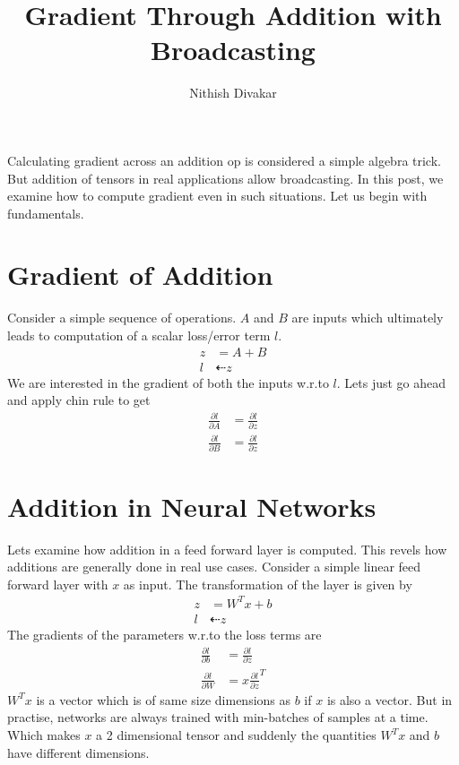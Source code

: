 \documentclass[12pt,crop=false,class=article,convert={density=300,outext=.compiled.png}]{standalone}
\title{\Huge Gradient Through Addition with Broadcasting}
\date{}
\author{Nithish Divakar}
\begin{document}
\maketitle


Calculating gradient across an addition op is considered a simple algebra trick. But addition of tensors in real applications allow broadcasting. In this post, we examine how to compute gradient even in such situations.  Let us begin with fundamentals.

\section*{Gradient of Addition}

Consider a simple sequence of operations. $A$ and $B$ are inputs which ultimately leads to computation of a scalar loss/error term $l$. 
 \begin{align*}
  z &= A+B
  \\
  l &\dashleftarrow z
 \end{align*}
We are interested in the gradient of both the inputs w.r.to $l$. Lets just go ahead and apply chin rule to get
\begin{align*}
  \frac{\partial l}{\partial A} &= \frac{\partial l}{\partial z}
  \\ 
  \frac{\partial l}{\partial B} &= \frac{\partial l}{\partial z}
\end{align*}

\section*{Addition in Neural Networks}

Lets examine how addition in a feed forward layer is computed. This revels how additions are generally done in real use cases. Consider a simple linear feed forward layer with $x$ as input. The transformation of the layer is given by
\begin{align*}
  z &= W^Tx+b
  \\
  l &\dashleftarrow z
\end{align*}
The gradients of the parameters w.r.to the loss terms are 
\begin{align*}
  \frac{\partial l}{\partial b} &=\frac{\partial l}{\partial z}
  \\
  \frac{\partial l}{\partial W} &= x \frac{\partial l}{\partial z}^T
\end{align*}
$W^Tx$ is a vector which is of same size dimensions as $b$ if $x$ is also a vector. But in practise, networks are always trained with min-batches of samples  at a time. Which makes $x$ a 2 dimensional tensor and suddenly the quantities $W^Tx$ and $b$ have different dimensions. 
\end{document}

